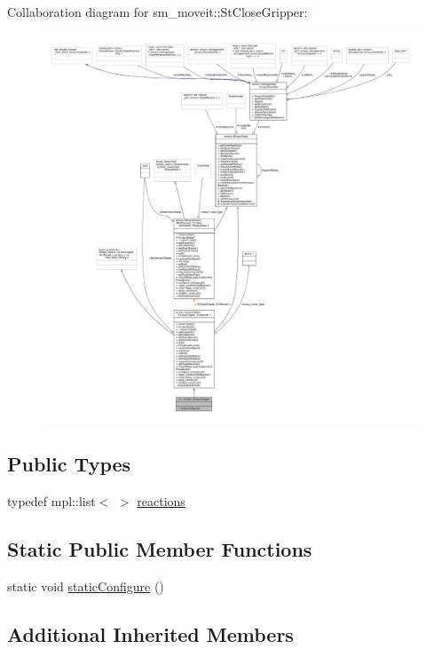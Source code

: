 Collaboration diagram for sm\+\_\+moveit\+:\+:St\+Close\+Gripper\+:
\nopagebreak
\begin{figure}[H]
\begin{center}
\leavevmode
\includegraphics[width=350pt]{structsm__moveit_1_1StCloseGripper__coll__graph}
\end{center}
\end{figure}
\subsection*{Public Types}
\begin{DoxyCompactItemize}
\item 
typedef mpl\+::list$<$  $>$ \hyperlink{structsm__moveit_1_1StCloseGripper_ae188784302fbdd070aa16722ea71a302}{reactions}
\end{DoxyCompactItemize}
\subsection*{Static Public Member Functions}
\begin{DoxyCompactItemize}
\item 
static void \hyperlink{structsm__moveit_1_1StCloseGripper_ac0f474de5c1df4e2bf988109376cb7fb}{static\+Configure} ()
\end{DoxyCompactItemize}
\subsection*{Additional Inherited Members}


